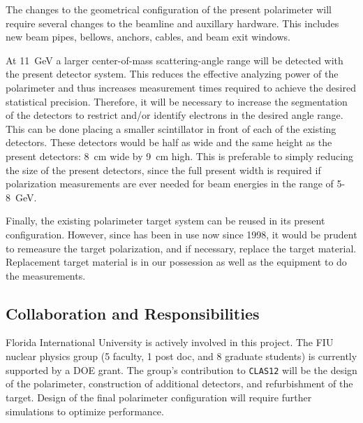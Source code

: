 The changes to the geometrical configuration of the present polarimeter
will require several changes to the beamline and auxillary hardware.  This
includes new beam pipes, bellows, anchors, cables, and beam exit windows.

At 11~GeV a larger center-of-mass scattering-angle range will be
detected with the present detector system.  This reduces the effective
analyzing power of the polarimeter and thus increases measurement times
required to achieve the desired statistical precision.  Therefore, it will
be necessary to increase the segmentation of the detectors to restrict
and/or identify electrons in the desired angle range. This can be done
placing a smaller scintillator in front of each of the existing detectors.
These detectors would be half as wide and the same height as the present
detectors: 8~cm wide by 9~cm high.  This is preferable to simply reducing
the size of the present detectors, since the full present width is required
if polarization measurements are ever needed for beam energies in the range
of 5-8~GeV.

Finally, the existing polarimeter target system can be reused in its
present configuration.  However, since has been in use now since 1998, it
would be prudent to remeasure the target polarization, and if necessary,
replace the target material.  Replacement target material is in our
possession as well as the equipment to do the measurements.

\subsection{Collaboration and Responsibilities}

Florida International University is actively involved in this project. The
FIU nuclear physics group (5 faculty, 1 post doc, and 8 graduate students)
is currently supported by a DOE grant. The group's contribution to
{\tt CLAS12} will be the design of the polarimeter, construction of additional
detectors, and refurbishment of the target.  Design of the final polarimeter 
configuration will require further simulations to optimize performance. 


